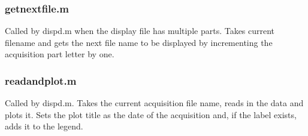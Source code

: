 \subsubsection[getnextfile.m]{getnextfile.m}
Called by dispd.m when the display file has multiple parts. Takes current filename and gets
the next file name to be displayed by incrementing the acquisition part letter by one.


\subsubsection[readandplot.m]{readandplot.m}
Called by dispd.m. Takes the current acquisition file name, reads in the data and plots it.
Sets the plot title as the date of the acquisition and, if the label exists, adds it to the
legend.
